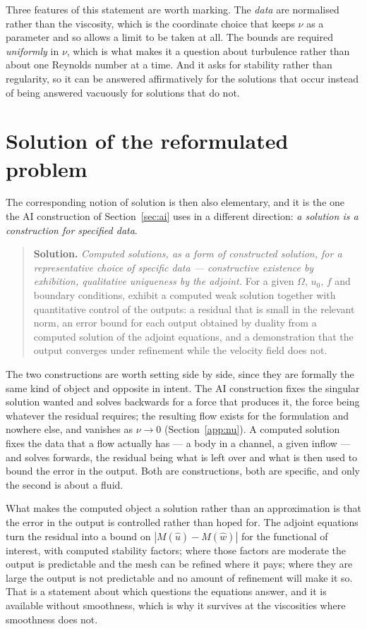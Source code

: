 \documentclass[11pt]{article}
\begin{document}
Three features of this statement are worth marking. The \emph{data} are normalised rather than the
viscosity, which is the coordinate choice that keeps $\nu$ as a parameter and so allows a limit to be
taken at all. The bounds are required \emph{uniformly} in $\nu$, which is what makes it a question
about turbulence rather than about one Reynolds number at a time. And it asks for stability rather
than regularity, so it can be answered affirmatively for the solutions that occur instead of being
answered vacuously for solutions that do not.

\section{Solution of the reformulated problem}\label{sec:posssol}

The corresponding notion of solution is then also elementary, and it is the one the AI construction
of Section~\ref{sec:ai} uses in a different direction: \emph{a solution is a construction for
specified data}.

\begin{quote}
\textbf{Solution.} \emph{Computed solutions, as a form of constructed solution, for a
representative choice of specific data --- constructive existence by exhibition, qualitative
uniqueness by the adjoint.} For a given $\Omega$, $u_0$, $f$ and boundary conditions,
exhibit a computed weak solution together with quantitative control of the outputs: a residual that
is small in the relevant norm, an error bound for each output obtained by duality from a computed
solution of the adjoint equations, and a demonstration that the output converges under refinement
while the velocity field does not.
\end{quote}

The two constructions are worth setting side by side, since they are formally the same kind of
object and opposite in intent. The AI construction fixes the singular solution wanted and solves
backwards for a force that produces it, the force being whatever the residual requires; the
resulting flow exists for the formulation and nowhere else, and vanishes as $\nu\to0$
(Section~\ref{app:nu}). A computed solution fixes the data that a flow actually has --- a body in a
channel, a given inflow --- and solves forwards, the residual being what is left over and what is
then used to bound the error in the output. Both are constructions, both are specific, and only the
second is about a fluid.

What makes the computed object a solution rather than an approximation is that the error in the
output is controlled rather than hoped for. The adjoint equations turn the residual into a bound on
$|M(\hat u)-M(\hat w)|$ for the functional of interest, with computed stability factors; where those
factors are moderate the output is predictable and the mesh can be refined where it pays; where they
are large the output is not predictable and no amount of refinement will make it so. That is a
statement about which questions the equations answer, and it is available without smoothness, which
is why it survives at the viscosities where smoothness does not.
\end{document}
